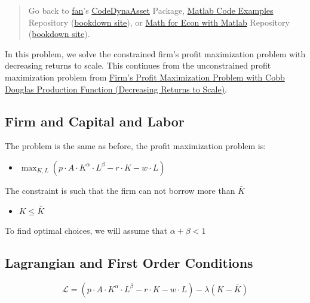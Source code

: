\documentclass[
]{book}
\providecommand{\tightlist}{%
  \setlength{\itemsep}{0pt}\setlength{\parskip}{0pt}}
\begin{document}
\begin{quote}
Go back to \href{http://fanwangecon.github.io/}{fan}'s \href{https://fanwangecon.github.io/CodeDynaAsset/}{CodeDynaAsset} Package, \href{https://fanwangecon.github.io/M4Econ/}{Matlab Code Examples} Repository (\href{https://fanwangecon.github.io/M4Econ/bookdown}{bookdown site}), or \href{https://fanwangecon.github.io/Math4Econ/}{Math for Econ with Matlab} Repository (\href{https://fanwangecon.github.io/Math4Econ/bookdown}{bookdown site}).
\end{quote}

In this problem, we solve the constrained firm's profit maximization
problem with decreasing returns to scale. This continues from the
unconstrained profit maximization problem from \href{https://fanwangecon.github.io/Math4Econ/matrix_application/KL_borrowhire_firm.html}{Firm's Profit
Maximization Problem with Cobb Douglas Production Function (Decreasing
Returns to
Scale)}.

\hypertarget{firm-and-capital-and-labor-1}{%
\subsection{Firm and Capital and Labor}\label{firm-and-capital-and-labor-1}}

The problem is the same as before, the profit maximization problem is:

\begin{itemize}
\tightlist
\item
  \(\displaystyle \max_{K,L} \left(p\cdot A\cdot K^{\alpha } \cdot L^{\beta } -r\cdot K-w\cdot L\right)\)
\end{itemize}

The constraint is such that the firm can not borrow more than \(\bar{K}\)

\begin{itemize}
\tightlist
\item
  \(\displaystyle K\le \bar{K}\)
\end{itemize}

To find optimal choices, we will assume that \(\alpha +\beta <1\)

\hypertarget{lagrangian-and-first-order-conditions}{%
\subsection{Lagrangian and First Order Conditions}\label{lagrangian-and-first-order-conditions}}

\[\mathcal{L}=\left(p\cdot A\cdot K^{\alpha } \cdot L^{\beta } -r\cdot K-w\cdot L\right)-\lambda \left(K-\bar{K} \right)\]
\end{document}
